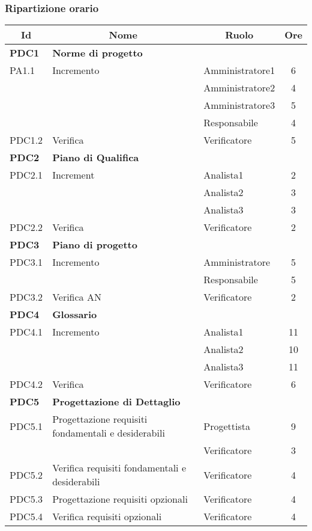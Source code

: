 \subsubsection{Ripartizione orario}
\begin{table}[H]
	\centering
	\begin{tabular*}{1\textwidth}{ @{\extracolsep{\fill} } l l l c  }
	\hline
	\multicolumn{1}{c}{\textbf{Id}} & 
	\multicolumn{1}{c}{\textbf{Nome}} & 
	\multicolumn{1}{c}{\textbf{Ruolo}}& 
	\multicolumn{1}{c}{\textbf{Ore}} \\
	\hline
	
	\textbf{PDC1} & \textbf{Norme di progetto} \\
	\cline{3-4}
	PA1.1 & Incremento & Amministratore1 & 6\\ 
    & & Amministratore2 & 4\\
    & & Amministratore3 & 5 \\
    & & Responsabile & 4 \\
    \cline{3-4}
	PDC1.2 & Verifica & Verificatore &  5\\
	
	\hline
	\textbf{PDC2} & \textbf{Piano di Qualifica} \\
	\cline{3-4}
	PDC2.1 & Increment & Analista1 & 2\\ 
    & & Analista2 & 3\\
    & & Analista3 & 3 \\
    \cline{3-4}
	PDC2.2 & Verifica & Verificatore &  2\\
	
	\hline
	\textbf{PDC3}  & \textbf{Piano di progetto} \\
	\cline{3-4}
	PDC3.1 & Incremento & Amministratore & 5\\ 
    & & Responsabile & 5\\
    \cline{3-4}
	PDC3.2 & Verifica AN & Verificatore &  2\\

	\hline
	\textbf{PDC4} & \textbf{Glossario} \\
	\cline{3-4}
	PDC4.1 & Incremento & Analista1 & 11\\ 
    & & Analista2 & 10\\
    & & Analista3 & 11\\
    \cline{3-4}
	PDC4.2 & Verifica & Verificatore &  6\\

        \hline
        \textbf{PDC5} & \textbf{Progettazione di Dettaglio} \\
	\cline{3-4}
	PDC5.1 & Progettazione requisiti fondamentali e desiderabili & Progettista & 9\\ 
        & & Verificatore & 3 \\
        \cline{3-4}
	PDC5.2 & Verifica requisiti fondamentali e desiderabili & Verificatore &  4\\
        \cline{3-4}
	PDC5.3 & Progettazione requisiti opzionali & Verificatore &  4\\
        \cline{3-4}
	PDC5.4 & Verifica requisiti opzionali & Verificatore &  4\\


\end{tabular*}
\end{table}
